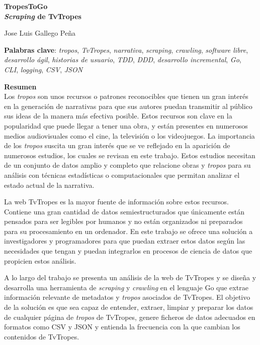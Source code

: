 \thispagestyle{empty}

\begin{center}
{\large\bfseries TropesToGo \\ \textit{Scraping} de TvTropes }\\
\end{center}
\begin{center}
Jose Luis Gallego Peña\\
\end{center}


\vspace{0.5cm}
\noindent\textbf{Palabras clave}: \textit{tropos}, \textit{TvTropes},
\textit{narrativa}, \textit{scraping}, \textit{crawling}, \textit{software
libre}, \textit{desarrollo ágil}, \textit{historias de usuario}, \textit{TDD},
\textit{DDD}, \textit{desarrollo incremental}, \textit{Go}, \textit{CLI},
\textit{logging}, \textit{CSV},
\textit{JSON}
\vspace{0.7cm}

\noindent\textbf{Resumen}\\
	
Los \textit{tropos} son unos recursos o patrones reconocibles que tienen un gran
interés en la generación de narrativas para que sus autores puedan transmitir al
público sus ideas de la manera más efectiva posible. Estos recursos son clave en
la popularidad que puede llegar a tener una obra, y están presentes en numerosos
medios audiovisuales como el cine, la televisión o los videojuegos. La
importancia de los \textit{tropos} suscita un gran interés que se ve reflejado
en la aparición de numerosos estudios, los cuales se revisan en este trabajo.
Estos estudios necesitan de un conjunto de datos amplio y completo que relacione
obras y \textit{tropos} para su análisis con técnicas estadísticas o
computacionales que permitan analizar el estado actual de la narrativa.

La web TvTropes es la mayor fuente de información sobre estos recursos. Contiene
una gran cantidad de datos semiestructurados que únicamente están pensados para
ser legibles por humanos y no están organizados ni preparados para su
procesamiento en un ordenador. En este trabajo se ofrece una solución a
investigadores y programadores para que puedan extraer estos datos según las
necesidades que tengan y puedan integrarlos en procesos de ciencia de datos que
propicien estos análisis.

A lo largo del trabajo se presenta un análisis de la web de TvTropes y se diseña
y desarrolla una herramienta de \textit{scraping} y \textit{crawling} en el
lenguaje Go que extrae información relevante de metadatos y \textit{tropos}
asociados de TvTropes. El objetivo de la solución es que sea capaz de entender,
extraer, limpiar y preparar los datos de cualquier página de \textit{tropos} de
TvTropes, genere ficheros de datos adecuados en formatos como CSV y JSON y
entienda la frecuencia con la que cambian los contenidos de TvTropes.

